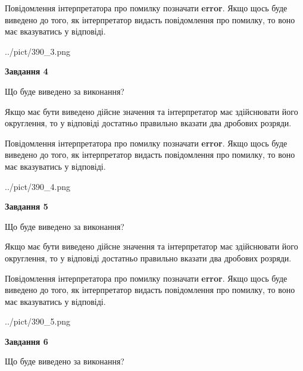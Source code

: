 \documentclass[12pt, ukrainian]{article}
\begin{document}
{\begin {Large}
Повідомлення інтерпретатора про помилку позначати \textbf{error}.
Якщо щось буде виведено до того, як інтерпретатор видасть повідомлення про помилку, 
то воно має вказуватись у відповіді. \par

\begin{center}
	{../pict/390_3.png}
\end{center}
\newpage

{\begin {center}\textbf{Завдання 4}\end {center}}\par
Що буде виведено за виконання? \par

Якщо має бути виведено дійсне значення та інтерпретатор має здійснювати його округлення, 
то у відповіді достатньо правильно вказати два дробових розряди.

Повідомлення інтерпретатора про помилку позначати \textbf{error}.
Якщо щось буде виведено до того, як інтерпретатор видасть повідомлення про помилку, 
то воно має вказуватись у відповіді. \par

\begin{center}
	{../pict/390_4.png}
\end{center}
\newpage

{\begin {center}\textbf{Завдання 5}\end {center}}\par
Що буде виведено за виконання? \par

Якщо має бути виведено дійсне значення та інтерпретатор має здійснювати його округлення, 
то у відповіді достатньо правильно вказати два дробових розряди.

Повідомлення інтерпретатора про помилку позначати \textbf{error}.
Якщо щось буде виведено до того, як інтерпретатор видасть повідомлення про помилку, 
то воно має вказуватись у відповіді. \par

\begin{center}
	{../pict/390_5.png}
\end{center}
\newpage

{\begin {center}\textbf{Завдання 6}\end {center}}\par
Що буде виведено за виконання? \par


\end{Large}}
\end{document}
